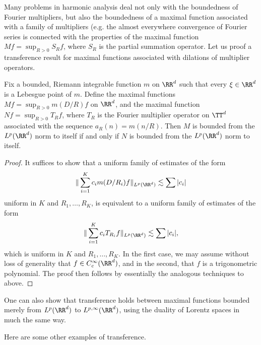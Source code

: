 Many problems in harmonic analysis deal not only with the boundedness of Fourier multipliers, but also the boundedness of a maximal function associated with a family of multipliers (e.g. the almost everywhere convergence of Fourier series is connected with the properties of the maximal function $Mf = \sup_{R > 0} S_R f$, where $S_R$ is the partial summation operator. Let us proof a transference result for maximal functions associated with dilations of multiplier operators.

\begin{theorem}
    Fix a bounded, Riemann integrable function $m$ on $\RR^d$ such that every $\xi \in \RR^d$ is a Lebesgue point of $m$. Define the maximal functions $Mf = \sup_{R > 0} m(D/R) f$ on $\RR^d$, and the maximal function $Nf = \sup_{R > 0} T_R f$, where $T_R$ is the Fourier multiplier operator on $\TT^d$ associated with the sequence $a_R(n) = m(n/R)$. Then $M$ is bounded from the $L^p(\RR^d)$ norm to itself if and only if $N$ is bounded from the $L^p(\RR^d)$ norm to itself.
\end{theorem}
\begin{proof}
    It suffices to show that a uniform family of estimates of the form
    \[ \| \sum_{i = 1}^K c_i m(D/R_i) f \|_{L^p(\RR^d)} \lesssim \sum |c_i| \]
    uniform in $K$ and $R_1, \dots, R_K$, is equivalent to a uniform family of estimates of the form
    \[ \| \sum_{i = 1}^K c_i T_{R_i} f \|_{L^p(\RR^d)} \lesssim \sum |c_i|, \]
    which is uniform in $K$ and $R_1, \dots, R_K$. In the first case, we may assume without loss of generality that $f \in C_c^\infty(\RR^d)$, and in the second, that $f$ is a trigonometric polynomial. The proof then follows by essentially the analogous techniques to above.
\end{proof}

\begin{remark}
    One can also show that transference holds between maximal functions bounded merely from $L^p(\RR^d)$ to $L^{p,\infty}(\RR^d)$, using the duality of Lorentz spaces in much the same way.
\end{remark}

Here are some other examples of transference.

